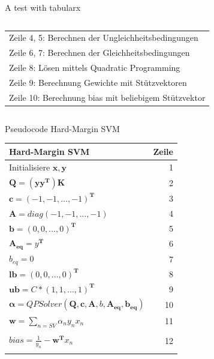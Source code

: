 \documentclass[ngerman]{beamer}
\begin{document}
\begin{frame} {A test with tabularx}
\begin{columns}[T]
\begin{column}{0.3\textwidth}
\begin{tabularx}{1.0\textwidth}{|X|}
            Zeile 4, 5: Berechnen der Ungleichheitsbedingungen\\
            Zeile 6, 7: Berechnen der Gleichheitsbedingungen\\
            Zeile 8: Lösen mittels Quadratic Programming \\
            Zeile 9: Berechnung Gewichte mit Stützvektoren \\
            Zeile 10: Berechnung bias mit beliebigem Stützvektor \\
            \hline
        \end{tabularx}
        \end{column}
    \end{columns}

\end{frame}

\begin{frame}{Pseudocode Hard-Margin SVM}
    \begin{tabular}{|l r|}
        \hline
        \textbf{Hard-Margin SVM} & \textbf{Zeile} \\
        \hline
        Initialisiere $\mathbf{x}, \mathbf{y}$ & 1\\
        $\mathbf{Q} = (\mathbf{y}\mathbf{y}^{\mathbf{T}})\mathbf{K}$ & 2\\
        $\mathbf{c} = \left( -1, -1, \ldots, -1 \right)^{\mathbf{T}}$ & 3 \\
        $\mathbf{A} = diag\left( -1, -1, \ldots, -1 \right)$ & 4 \\
        $\mathbf{b} = \left( 0, 0, \ldots, 0 \right)^{\mathbf{T}}$ & 5\\
        $\mathbf{A_{eq}} = y^{\mathbf{T}}$ & 6\\
        $b_{eq} = 0$ & 7\\
        $\mathbf{lb} = \left( 0, 0, \ldots, 0 \right)^{\mathbf{T}}$ & 8 \\
        $\mathbf{ub} = C * \left( 1, 1, \ldots, 1 \right)^{\mathbf{T}}$ & 9 \\
        $\mathbf{\alpha} = QPSolver\left( \mathbf{Q}, \mathbf{c}, \mathbf{A}, b, \mathbf{A_{eq}}, \mathbf{b_{eq}} \right)$ & 10\\
        $\mathbf{w} = \sum\limits_{n=SV} \alpha_{n} y_{n} x_{n}$  & 11\\
        & \\[-1em]
        $bias = \frac{1}{y_{n}} - \mathbf{w}^{\mathbf{T}}x_{n}$ & 12\\
        & \\
        \hline
    \end{tabular}
\end{frame}
\end{document}
